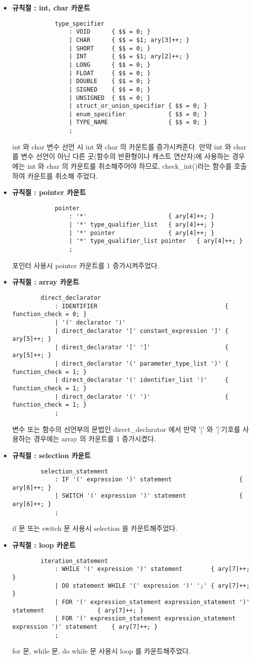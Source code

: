 \documentclass{article}
\begin{document}
\begin{itemize}
\begin{itemize}
		\item {\bf 규칙절 : int, char 카운트}
		\begin{lstlisting}
			type_specifier
				: VOID		{ $$ = 0; }
				| CHAR		{ $$ = $1; ary[3]++; }
				| SHORT		{ $$ = 0; }
				| INT		{ $$ = $1; ary[2]++; }
				| LONG		{ $$ = 0; }
				| FLOAT		{ $$ = 0; }
				| DOUBLE	{ $$ = 0; }
				| SIGNED	{ $$ = 0; }
				| UNSIGNED	{ $$ = 0; }
				| struct_or_union_specifier	{ $$ = 0; }
				| enum_specifier			{ $$ = 0; }
				| TYPE_NAME					{ $$ = 0; }
				;
		\end{lstlisting}
		int 와 char 변수 선언 시 int 와 char 의 카운트를 증가시켜준다.
		만약 int 와 char 를 변수 선언이 아닌 다른 곳(함수의 반환형이나 캐스트 연산자)에
		사용하는 경우에는 int 와 char 의 카운트를 취소해주어야 하므로, check\_int()라는
		함수를 호출하여 카운트를 취소해 주었다. 

		\item {\bf 규칙절 : pointer 카운트}
		\begin{lstlisting}
			pointer
				: '*'						{ ary[4]++; }
				| '*' type_qualifier_list	{ ary[4]++; }
				| '*' pointer				{ ary[4]++; }
				| '*' type_qualifier_list pointer	{ ary[4]++; }
				;
		\end{lstlisting}
		포인터 사용시 pointer 카운트를 1 증가시켜주었다.

		\item {\bf 규칙절 : array 카운트}
		\begin{lstlisting}
		direct_declarator
			: IDENTIFIER									{ function_check = 0; }
			| '(' declarator ')'		
			| direct_declarator '[' constant_expression ']'	{ ary[5]++; }
			| direct_declarator '[' ']'						{ ary[5]++; }
			| direct_declarator '(' parameter_type_list ')' { function_check = 1; }
			| direct_declarator '(' identifier_list ')'		{ function_check = 1; }
			| direct_declarator '(' ')'						{ function_check = 1; }
			;
		\end{lstlisting}
		변수 또는 함수의 선언부의 문법인 direct\_declarator 에서 만약 '[' 와 ']'기호를 사용하는 경우에는
		array 의 카운트를 1 증가시켰다.

		\item {\bf 규칙절 : selection 카운트}
		\begin{lstlisting}
		selection_statement
			: IF '(' expression ')' statement					{ ary[6]++; }
			| SWITCH '(' expression ')' statement				{ ary[6]++; }
			;
		\end{lstlisting}
		if 문 또는 switch 문 사용시 selection 을 카운트해주었다.

		\item {\bf 규칙절 : loop 카운트}
		\begin{lstlisting}
		iteration_statement
			: WHILE '(' expression ')' statement		{ ary[7]++; }
			| DO statement WHILE '(' expression ')' ';'	{ ary[7]++; }
			| FOR '(' expression_statement expression_statement ')' statement				{ ary[7]++; }
			| FOR '(' expression_statement expression_statement expression ')' statement	{ ary[7]++; }
			;
		\end{lstlisting}
		for 문, while 문, do while 문 사용시 loop 를 카운트해주었다.


\end{itemize}
\end{itemize}
\end{document}

